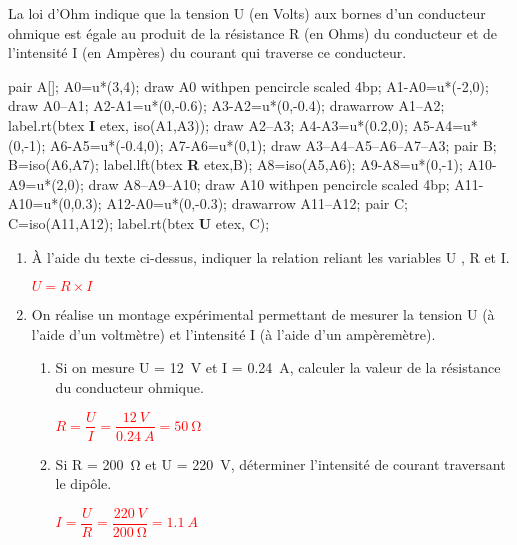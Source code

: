 \begin{corrige}
    La loi d'Ohm indique que la tension U (en Volts) aux bornes d'un conducteur ohmique est égale au produit de la résistance R (en Ohms) du
    conducteur et de l'intensité I (en Ampères) du courant qui traverse ce conducteur.\par
    \begin{center}
        \begin{Geometrie}            
            pair A[];
            A0=u*(3,4);
            draw A0 withpen pencircle scaled 4bp;
            A1-A0=u*(-2,0);
            draw A0--A1;
            A2-A1=u*(0,-0.6);
            A3-A2=u*(0,-0.4);
            drawarrow A1--A2;
            label.rt(btex \textbf{I} etex, iso(A1,A3));
            draw A2--A3;
            A4-A3=u*(0.2,0);
            A5-A4=u*(0,-1);
            A6-A5=u*(-0.4,0);
            A7-A6=u*(0,1);
            draw A3--A4--A5--A6--A7--A3;
            pair B;
            B=iso(A6,A7);
            label.lft(btex \textbf{R} etex,B);
            A8=iso(A5,A6);
            A9-A8=u*(0,-1);
            A10-A9=u*(2,0);
            draw A8--A9--A10;
            draw A10 withpen pencircle scaled 4bp;
            A11-A10=u*(0,0.3);
            A12-A0=u*(0,-0.3);
            drawarrow A11--A12;
            pair C;
            C=iso(A11,A12);
            label.rt(btex \textbf{U} etex, C);
        \end{Geometrie}
    \end{center}
    \Coupe
    \begin{enumerate}
        \item À l'aide du texte ci-dessus, indiquer la relation reliant les variables U , R et I.
        \par\textcolor{red}{$U=R\times I$}
        \item On réalise un montage expérimental permettant de mesurer la tension U (à l'aide d'un voltmètre) et l'intensité I (à l'aide d'un ampèremètre).\\
        \begin{enumerate}
            \item Si on mesure U = \SI{12}{V} et I = \SI{0.24}{A}, calculer la valeur de la résistance du conducteur ohmique.
            \par\textcolor{red}{$R=\dfrac{U}{I}=\dfrac{\SI{12}{V}}{\SI{0.24}{A}}=\SI{50}{\ohm}$}
            \item Si R = \SI{200}{\ohm} et U = \SI{220}{V}, déterminer l'intensité de courant traversant le dipôle.
            \par\textcolor{red}{$I=\dfrac{U}{R}=\dfrac{\SI{220}{V}}{\SI{200}{\ohm}}=\SI{1.1}{A}$}
        \end{enumerate}
    \end{enumerate}
\end{corrige}

